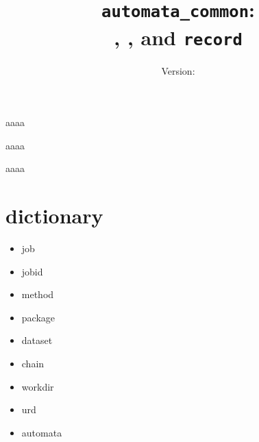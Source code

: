 \documentclass[a4paper]{report}
\title{\texttt{automata\_common}:\\ \jobtuple, \joblist, and \texttt{record}}
\author{Version: \inputfile{gitrevision}}
\date{}
\begin{document}

\begin{pythonBEG}
aaaa
\end{pythonBEG}

\begin{pythonMID}
aaaa
\end{pythonMID}

\begin{pythonEND}
aaaa
\end{pythonEND}




\section{dictionary}
\begin{itemize}
\item job
\item jobid
\item method
\item package
\item dataset
\item chain
\item workdir
\item urd
\item automata
\end{itemize}
\end{document}
